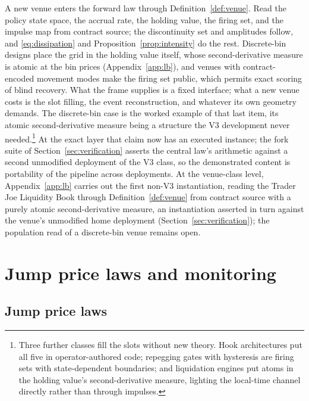 \documentclass[11pt,a4paper]{article}
\theoremstyle{definition}
\theoremstyle{plain}
\theoremstyle{remark}
\begin{document}
A new venue enters the forward law through Definition~\ref{def:venue}. Read the policy state space, the accrual rate, the holding value, the firing set, and the impulse map from contract source; the 
discontinuity set and amplitudes follow, and \eqref{eq:dissipation} and Proposition~\ref{prop:intensity} do the rest. Discrete-bin designs place the grid in the holding value itself, whose second-derivative 
measure is atomic at the bin prices (Appendix~\ref{app:lb}), and venues with contract-encoded movement modes make the firing set public, which permits exact scoring of blind recovery. What the 
frame supplies is a fixed interface; what a new venue costs is the slot filling, the event reconstruction, and whatever its own geometry demands. The discrete-bin case is the worked example of 
that last item, its atomic second-derivative measure being a structure the V3 development never needed.\footnote{Three further classes fill the slots without new theory. Hook architectures put all 
five in operator-authored code; repegging gates with hysteresis are firing sets with state-dependent boundaries; and liquidation engines put atoms in the holding value's second-derivative measure, 
lighting the local-time channel directly rather than through impulses.} At the exact layer that claim now has an executed instance; the fork suite of Section~\ref{sec:verification} asserts the central 
law's arithmetic against a second unmodified deployment of the V3 class, so the demonstrated content is portability of the pipeline across deployments. At the venue-class level, Appendix~\ref{app:lb} 
carries out the first non-V3 instantiation, reading the Trader Joe Liquidity Book through Definition~\ref{def:venue} from contract source with a purely atomic second-derivative measure, an 
instantiation asserted in turn against the venue's unmodified home deployment (Section~\ref{sec:verification}); the population read of a discrete-bin venue remains open.


\section{Jump price laws and monitoring}\label{sec:extensions}\label{sec:instrumentresponse}

\subsection{Jump price laws}\label{sec:jumps}
\end{document}
